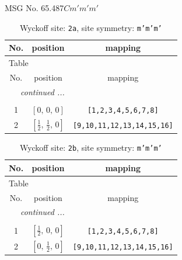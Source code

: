 \documentclass[fleqn,8pt]{jsarticle}
\begin{document}
\setcounter{MaxMatrixCols}{32}

\renewcommand{\tablename}{Table~}
\renewcommand{\figurename}{Figure~}
\begin{center}
\LARGE
MSG No. 65.487\quad$Cm'm'm'$
\end{center}
\renewcommand{\arraystretch}{1.2}
\begin{longtable}{ccc}
\caption{Wyckoff site: {\tt 2a}, site symmetry: {\tt m'm'm'}}
 \\
 \hline \hline
No. & position & mapping \\ \hline \endfirsthead

\multicolumn{2}{l}{\tablename\ \thetable{}} \\
 \hline \hline
No. & position & mapping \\ \hline \endhead

 \hline \hline
\multicolumn{2}{r}{\footnotesize\it continued ...} \\ \endfoot

 \hline \hline
\multicolumn{2}{r}{} \\ \endlastfoot

1 & $\left[ 0,\, 0,\, 0 \right]$ & {\tt [1,2,3,4,5,6,7,8]} \\ \hline
2 & $\left[ \frac{1}{2},\, \frac{1}{2},\, 0 \right]$ & {\tt [9,10,11,12,13,14,15,16]} \\
\end{longtable}
\renewcommand{\arraystretch}{1.2}
\begin{longtable}{ccc}
\caption{Wyckoff site: {\tt 2b}, site symmetry: {\tt m'm'm'}}
 \\
 \hline \hline
No. & position & mapping \\ \hline \endfirsthead

\multicolumn{2}{l}{\tablename\ \thetable{}} \\
 \hline \hline
No. & position & mapping \\ \hline \endhead

 \hline \hline
\multicolumn{2}{r}{\footnotesize\it continued ...} \\ \endfoot

 \hline \hline
\multicolumn{2}{r}{} \\ \endlastfoot

1 & $\left[ \frac{1}{2},\, 0,\, 0 \right]$ & {\tt [1,2,3,4,5,6,7,8]} \\ \hline
2 & $\left[ 0,\, \frac{1}{2},\, 0 \right]$ & {\tt [9,10,11,12,13,14,15,16]} \\
\end{longtable}
\end{document}
